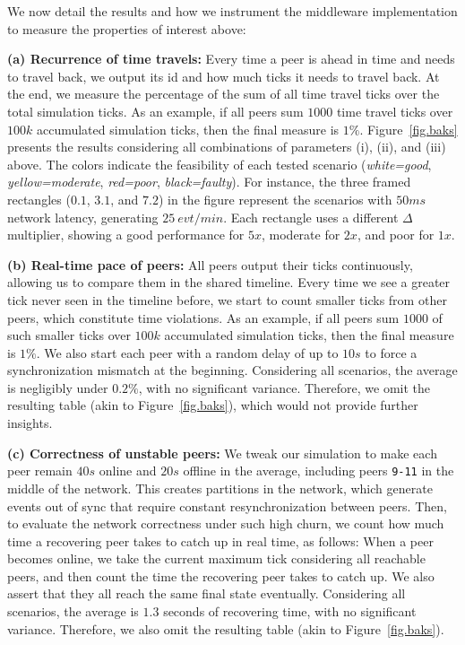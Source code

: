 \documentclass[12pt]{article}
\newcommand{\code}[1]  {\texttt{\small{#1}}}
\begin{document}
We now detail the results and how we instrument the middleware implementation
to measure the properties of interest above:

\textbf{(a) Recurrence of time travels:}
Every time a peer is ahead in time and needs to travel back, we output its id
and how much ticks it needs to travel back.
At the end, we measure the percentage of the sum of all time travel ticks over
the total simulation ticks.
As an example, if all peers sum $1000$ time travel ticks over $100k$
accumulated simulation ticks, then the final measure is $1\%$.
%
Figure~\ref{fig.baks} presents the results considering all combinations of
parameters (i), (ii), and (iii) above.
The colors indicate the feasibility of each tested scenario
    (\emph{white=good}, \emph{yellow=moderate}, \emph{red=poor},
    \emph{black=faulty}).
%
For instance, the three framed rectangles ($0.1$, $3.1$, and $7.2$) in the
figure represent the scenarios with $50ms$ network latency, generating
$25~evt/min$.
Each rectangle uses a different $\Delta$ multiplier, showing a good performance
for $5x$, moderate for $2x$, and poor for $1x$.

\textbf{(b) Real-time pace of peers:}
All peers output their ticks continuously, allowing us to compare them in the
shared timeline.
Every time we see a greater tick never seen in the timeline before, we start to
count smaller ticks from other peers, which constitute time violations.
As an example, if all peers sum $1000$ of such smaller ticks over $100k$
accumulated simulation ticks, then the final measure is $1\%$.
%
We also start each peer with a random delay of up to $10s$ to force a
synchronization mismatch at the beginning.
%
Considering all scenarios, the average is negligibly under $0.2\%$, with no
significant variance.
Therefore, we omit the resulting table (akin to Figure~\ref{fig.baks}), which
would not provide further insights.

\textbf{(c) Correctness of unstable peers:}
We tweak our simulation to make each peer remain $40s$ online and $20s$
offline in the average, including peers \code{9-11} in the middle of the
network.
This creates partitions in the network, which generate events out of sync that
require constant resynchronization between peers.
%
Then, to evaluate the network correctness under such high churn, we count how
much time a recovering peer takes to catch up in real time, as follows:
When a peer becomes online, we take the current maximum tick considering all
reachable peers, and then count the time the recovering peer takes to catch up.
We also assert that they all reach the same final state eventually.
%
Considering all scenarios, the average is $1.3$ seconds of recovering time,
with no significant variance.
Therefore, we also omit the resulting table (akin to Figure~\ref{fig.baks}).
\end{document}
